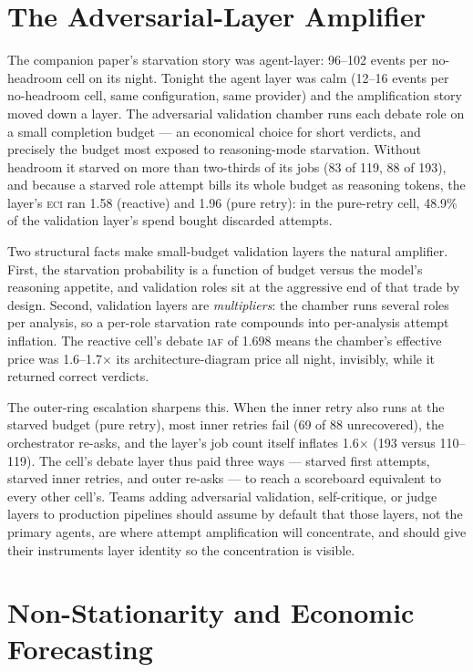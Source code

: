 \documentclass[11pt]{article}
\newcommand{\iaf}{\textsc{iaf}}
\newcommand{\eci}{\textsc{eci}}
\begin{document}
\section{The Adversarial-Layer Amplifier}\label{sec:amplifier}

The companion paper's starvation story was agent-layer: 96--102 events
per no-headroom cell on its night. Tonight the agent layer was calm
(12--16 events per no-headroom cell, same configuration, same
provider) and the amplification story moved down a layer. The
adversarial validation chamber runs each debate role on a small
completion budget --- an economical choice for short verdicts, and
precisely the budget most exposed to reasoning-mode starvation. Without
headroom it starved on more than two-thirds of its jobs (83 of 119, 88
of 193), and because a starved role attempt bills its whole budget as
reasoning tokens, the layer's \eci{} ran 1.58 (reactive) and 1.96
(pure retry): in the pure-retry cell, 48.9\% of the validation layer's
spend bought discarded attempts.

Two structural facts make small-budget validation layers the natural
amplifier. First, the starvation probability is a function of budget
versus the model's reasoning appetite, and validation roles sit at the
aggressive end of that trade by design. Second, validation layers are
\emph{multipliers}: the chamber runs several roles per analysis, so a
per-role starvation rate compounds into per-analysis attempt
inflation. The reactive cell's debate \iaf{} of 1.698 means the
chamber's effective price was 1.6--1.7$\times$ its architecture-diagram
price all night, invisibly, while it returned correct verdicts.

The outer-ring escalation sharpens this. When the inner retry also
runs at the starved budget (pure retry), most inner retries fail (69
of 88 unrecovered), the orchestrator re-asks, and the layer's job count
itself inflates 1.6$\times$ (193 versus 110--119). The cell's debate
layer thus paid three ways --- starved first attempts, starved inner
retries, and outer re-asks --- to reach a scoreboard equivalent to
every other cell's. Teams adding adversarial validation, self-critique,
or judge layers to production pipelines should assume by default that
those layers, not the primary agents, are where attempt amplification
will concentrate, and should give their instruments layer identity so
the concentration is visible.

\section{Non-Stationarity and Economic Forecasting}\label{sec:nonstationarity}
\end{document}
